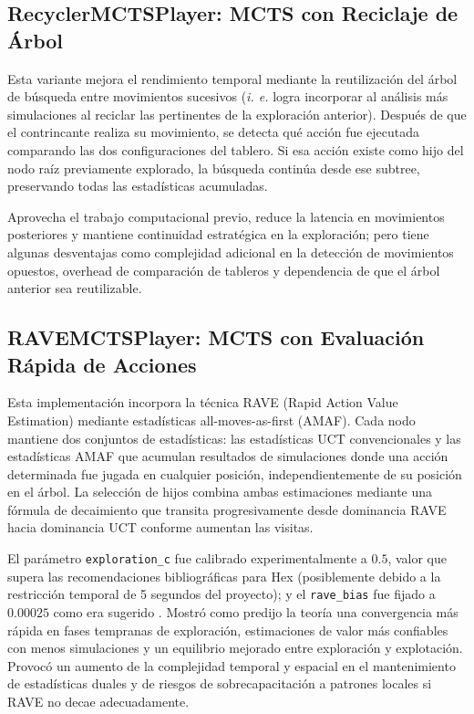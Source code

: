 \documentclass[12pt]{article}
\begin{document}
\subsection{RecyclerMCTSPlayer: MCTS con Reciclaje de Árbol}

Esta variante mejora el rendimiento temporal mediante la reutilización del árbol de búsqueda entre movimientos sucesivos (\textit{i. e.} logra incorporar al análisis más simulaciones al reciclar las pertinentes de la exploración anterior). Después de que el contrincante realiza su movimiento, se detecta qué acción fue ejecutada comparando las dos configuraciones del tablero. Si esa acción existe como hijo del nodo raíz previamente explorado, la búsqueda continúa desde ese subtree, preservando todas las estadísticas acumuladas.

Aprovecha el trabajo computacional previo, reduce la latencia en movimientos posteriores y mantiene continuidad estratégica en la exploración; pero tiene algunas desventajas como complejidad adicional en la detección de movimientos opuestos, overhead de comparación de tableros y dependencia de que el árbol anterior sea reutilizable.

\subsection{RAVEMCTSPlayer: MCTS con Evaluación Rápida de Acciones}

Esta implementación incorpora la técnica RAVE (Rapid Action Value Estimation) mediante estadísticas all-moves-as-first (AMAF). Cada nodo mantiene dos conjuntos de estadísticas: las estadísticas UCT convencionales y las estadísticas AMAF que acumulan resultados de simulaciones donde una acción determinada fue jugada en cualquier posición, independientemente de su posición en el árbol. La selección de hijos combina ambas estimaciones mediante una fórmula de decaimiento que transita progresivamente desde dominancia RAVE hacia dominancia UCT conforme aumentan las visitas.

El parámetro \texttt{exploration\_c} fue calibrado experimentalmente a $0.5$, valor que supera las recomendaciones bibliográficas \cite{Cazenave2009} para Hex (posiblemente debido a la restricción temporal de 5 segundos del proyecto); y el \texttt{rave\_bias} fue fijado a $0.00025$ como era sugerido \cite{Cazenave2009}. Mostró como predijo la teoría una convergencia más rápida en fases tempranas de exploración, estimaciones de valor más confiables con menos simulaciones y un equilibrio mejorado entre exploración y explotación. Provocó un aumento de la complejidad temporal y espacial en el mantenimiento de estadísticas duales y de riesgos de sobrecapacitación a patrones locales si RAVE no decae adecuadamente.
\end{document}
